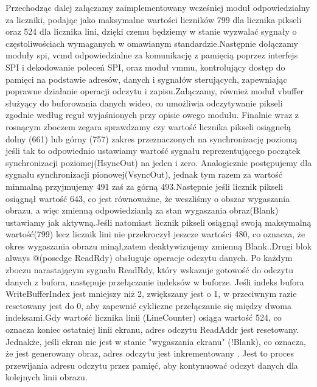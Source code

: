 \documentclass[12pt, a4paper]{article}
\begin{document}
Przechodząc dalej załączamy zaimplementowany wcześniej moduł odpowiedzialny za liczniki, podając jako maksymalne wartości liczników 799 dla licznika pikseli oraz 524 dla licznika lini, dzięki czemu będziemy w stanie wyzwalać sygnały o częstoliwościach wymaganych w omawianym standardzie.Następnie dołączamy moduły spi, vcmd  odpowiedzialne za komunikację z pamięcią poprzez interfejs SPI i dekodowanie poleceń SPI, oraz moduł vmmu, kontrolujący dostęp do pamięci na podstawie adresów, danych i sygnałów sterujących, zapewniając poprawne działanie operacji odczytu i zapisu.Załączamy, również moduł vbuffer służyący do buforowania danych wideo, co umożliwia odczytywanie pikseli zgodnie według reguł wyjaśnionych przy opisie owego modułu.
Finalnie wraz z rosnącym zboczem zegara sprawdzamy czy wartość licznika pikseli osiągnełą dolny (661) lub górny (757) zakres przeznaczonych na synchronizację poziomą jeśli tak to odpowiednio ustawiamy wartość sygnału reprezentującego początek synchronizacji poziomej(HsyncOut) na jeden i zero. Analogicznie postępujemy dla sygnału synchronizacji pionowej(VsyncOut), jednak tym razem za wartość minmalną przyjmujemy 491 zaś za górną 493.Następnie jeśli licznik pikseli osiągnął wartość 643, co jest równoważne, że weszliśmy o obszar wygaszania obrazu, a więc zmienną odpowiedzianlą za stan wygaszania obraz(Blank) ustawiamy jak aktywną.Jeśli natomiast licznik pikseli osiągnął swoją maksymalną wartość(799) lecz licznik lini nie przekroczył jeszcze wartości 480, co oznacza, że okres wygaszania obrazu minął,zatem deaktywizujemy zmienną Blank..Drugi blok always @(posedge ReadRdy) obsługuje operacje odczytu danych. Po każdym zboczu narastającym sygnału ReadRdy, który wskazuje gotowość do odczytu danych z bufora, następuje przełączanie indeksów w buforze. Jeśli indeks bufora WriteBufferIndex jest mniejszy niż 2, zwiększany jest o 1, w przeciwnym razie resetowany jest do 0, aby zapewnić cykliczne przełączanie się między dwoma indeksami.Gdy wartość licznika linii (LineCounter) osiąga wartość 524, co oznacza koniec ostatniej linii ekranu, adres odczytu ReadAddr jest resetowany. Jednakże, jeśli ekran nie jest w stanie "wygaszania ekranu" (!Blank), co oznacza, że jest generowany obraz, adres odczytu jest inkrementowany . Jest to proces przewijania adresu odczytu przez pamięć, aby kontynuować odczyt danych dla kolejnych linii obrazu.
\newpage
\end{document}
